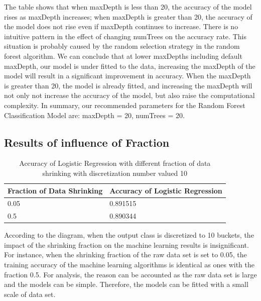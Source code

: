 \documentclass[conference]{IEEEtran}
\begin{document}
The table shows that when maxDepth is less than 20, the accuracy of the model rises as maxDepth increases; when maxDepth is greater than 20, the accuracy of the model does not rise even if maxDepth continues to increase. There is no intuitive pattern in the effect of changing numTrees on the accuracy rate. This situation is probably caused by the random selection strategy in the random forest algorithm. We can conclude that at lower maxDepths including default maxDepth, our model is under fitted to the data, increasing the maxDepth of the model will result in a significant improvement in accuracy. When the maxDepth is greater than 20, the model is already fitted, and increasing the maxDepth will not only not increase the accuracy of the model, but also raise the computational complexity. In summary, our recommended parameters for the Random Forest Classification Model are: maxDepth = 20, numTrees = 20. 

\subsection{Results of influence of Fraction}
\begin{table}[ht]
\begin{center}
\caption{Accuracy of Logistic Regression with different fraction of data shrinking with discretization number valued 10}
\begin{tabular}{|l|l|}
\hline
Fraction of Data Shrinking & Accuracy of Logistic Regression \\ \hline
0.05                       & 0.891515                        \\ \hline
0.5                        & 0.890344                        \\ \hline
\end{tabular}
\end{center}
\end{table}

According to the diagram, when the output class is discretized to 10 buckets, the impact of the shrinking fraction on the machine learning results is insignificant. For instance, when the shrinking fraction of the raw data set is set to 0.05, the training accuracy of the machine learning algorithms is identical as ones with the fraction 0.5. For analysis, the reason can be accounted as the raw data set is large and the models can be simple. Therefore, the models can be fitted with a small scale of data set.
\end{document}
